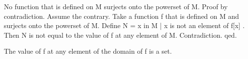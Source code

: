 \documentclass[a4paper,draft]{amsproc}
\begin{document}
\begin{proposition}
No function that is defined on M surjects onto the powerset of M.
Proof by contradiction.
Assume the contrary. Take a function f that is defined on M and surjects onto the powerset of M.
Define N = { x in M | x is not an element of f[x] }.
Then N is not equal to the value of f at any element of M.
Contradiction. qed.
\end{proposition}

\begin{theorem}
The value of f at any element of the domain of f is a set.
\end{theorem}
\end{document}
